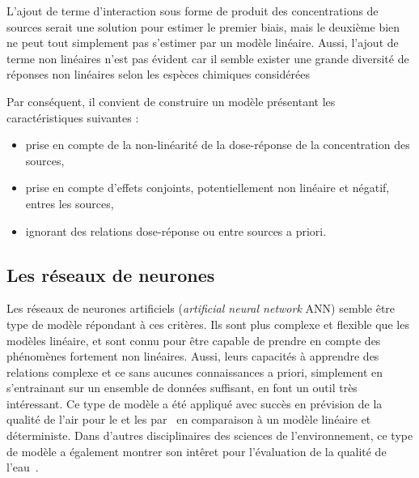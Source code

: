 L'ajout de terme d'interaction sous forme de produit des concentrations de sources serait
une solution pour estimer le premier biais, mais le deuxième bien ne peut tout simplement
pas s'estimer par un modèle linéaire. Aussi, l'ajout de terme non linéaires n'est pas
évident car il semble exister une grande diversité de réponses non linéaires selon les
espèces chimiques
considérées~\autocite{charrierDithiothreitol2012,charrierBias2016,calasImportance2017}

Par conséquent, il convient de construire un modèle présentant les caractéristiques
suivantes :
\begin{itemize}
    \item prise en compte de la non-linéarité de la dose-réponse de la concentration des
        sources,
    \item prise en compte d'effets conjoints, potentiellement non linéaire et négatif,
        entres les sources,
    \item ignorant des relations dose-réponse ou entre sources a priori.
\end{itemize}

\subsection{Les réseaux de neurones}%
\label{sub:les_réseaux_de_neurones}

Les réseaux de neurones artificiels (\textit{artificial neural network} ANN) semble être
type de modèle répondant à ces critères. Ils sont plus complexe et flexible que les
modèles linéaire, et sont connu pour être capable de prendre en compte des phénomènes
fortement non linéaires. Aussi, leurs capacités à apprendre des relations complexe et ce
sans aucunes connaissances a priori, simplement en s'entrainant sur un ensemble de données
suffisant, en font un outil très intéressant.
Ce type de modèle a été appliqué avec succès en prévision de la qualité de l'air pour le
 et les \PMdix{} par~\cite{kukkonenExtensive2003} en comparaison à un modèle
linéaire et déterministe. Dans d'autres disciplinaires des sciences de l'environnement, ce
type de modèle a également montrer son intêret pour l'évaluation de la qualité de
l'eau~\autocite{nathanApplication2017}.

